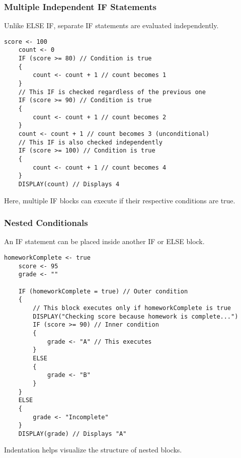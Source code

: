 \documentclass[11pt,oneside]{book}
\begin{document}
\subsubsection*{Multiple Independent IF Statements}
Unlike ELSE IF, separate IF statements are evaluated independently.
\begin{lstlisting}[language={}, label={lst:multiple_if}, caption={AP Pseudocode: Multiple Independent IFs}]
    score <- 100
    count <- 0
    IF (score >= 80) // Condition is true
    {
        count <- count + 1 // count becomes 1
    }
    // This IF is checked regardless of the previous one
    IF (score >= 90) // Condition is true
    {
        count <- count + 1 // count becomes 2
    }
    count <- count + 1 // count becomes 3 (unconditional)
    // This IF is also checked independently
    IF (score >= 100) // Condition is true
    {
        count <- count + 1 // count becomes 4
    }
    DISPLAY(count) // Displays 4
\end{lstlisting}
Here, multiple IF blocks can execute if their respective conditions are true.

\subsubsection*{Nested Conditionals}
An IF statement can be placed inside another IF or ELSE block.
\begin{lstlisting}[language={}, label={lst:nested_if}, caption={AP Pseudocode: Nested IFs}]
    homeworkComplete <- true
    score <- 95
    grade <- ""

    IF (homeworkComplete = true) // Outer condition
    {
        // This block executes only if homeworkComplete is true
        DISPLAY("Checking score because homework is complete...")
        IF (score >= 90) // Inner condition
        {
            grade <- "A" // This executes
        }
        ELSE
        {
            grade <- "B"
        }
    }
    ELSE
    {
        grade <- "Incomplete"
    }
    DISPLAY(grade) // Displays "A"
\end{lstlisting}
Indentation helps visualize the structure of nested blocks.
\end{document}
